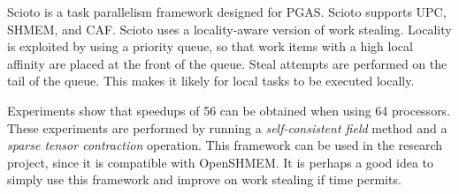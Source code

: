 Scioto \cite{dinan2008scioto} is a task parallelism framework designed for PGAS. Scioto supports UPC, SHMEM, and CAF. Scioto uses a locality-aware version of work stealing. Locality is exploited by using a priority queue, so that work items with a high local affinity are placed at the front of the queue. Steal attempts are performed on the tail of the queue. This makes it likely for local tasks to be executed locally.

Experiments show that speedups of 56 can be obtained when using 64 processors. These experiments are performed by running a \emph{self-consistent field} method and a \emph{sparse tensor contraction} operation. This framework can be used in the research project, since it is compatible with OpenSHMEM. It is perhaps a good idea to simply use this framework and improve on work stealing if time permits. 